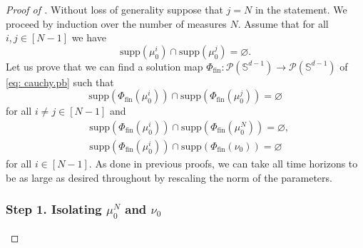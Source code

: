 \documentclass[a4paper,11pt]{article}
\theoremstyle{plain}
\newcommand{\supp}{\mathrm{supp}}
\renewcommand{\S}{\mathbb{S}^{d-1}}
\numberwithin{equation}{section}
\begin{document}
\begin{proof}[Proof of ]

Without loss of generality suppose that $j=N$ in the statement.
We proceed by induction over the number of measures $N$. 
Assume that for all $i, j\in[N-1]$ we have
\begin{equation*} %
\supp\left(\mu^i_0\right)\cap\supp\left(\mu^j_0\right)=\varnothing.
\end{equation*}
Let us prove that we can find a solution map $\Phi_{\text{fin}}:\mathscr{P}(\S)\to \mathscr{P}(\S)$ of \eqref{eq: cauchy.pb} such that
\begin{equation*}%
    \supp\left(\Phi_{\text{fin}}(\mu^i_0)\right)\cap\supp\left(\Phi_{\text{fin}}(\mu^j_0)\right)=\varnothing
\end{equation*}
for all $i\neq j\in[N-1]$ and
\begin{align*}%
    &\supp\left(\Phi_{\text{fin}}(\mu^i_0)\right)\cap\supp\left(\Phi_{\text{fin}}(\mu^N_0)\right)=\varnothing,\\
    &\supp\left(\Phi_{\text{fin}}(\mu^i_0)\right)\cap\supp\left(\Phi_{\text{fin}}(\nu_0)\right)=\varnothing
\end{align*}
for all $i\in[N-1]$. As done in previous proofs, we can take all time horizons to be as large as desired throughout by rescaling the norm of the parameters.
    

\subsubsection*{Step 1. Isolating $\mu_0^N$ and $\nu_0$}


\end{proof}
\end{document}

